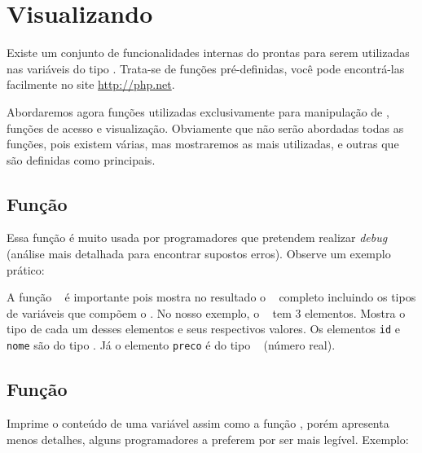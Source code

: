 

\section{Visualizando \tipoarrays}
\label{visualizando-arrays}

Existe um conjunto de funcionalidades internas do \php prontas para serem utilizadas nas variáveis
do tipo \tipoarray. Trata-se de funções pré-definidas, você pode encontrá-las facilmente no 
site \url{http://php.net}.

Abordaremos agora funções utilizadas exclusivamente para manipulação de \tipoarray, 
funções de acesso e visualização. Obviamente que não serão abordadas todas as funções, 
pois existem várias, mas mostraremos as mais utilizadas, e outras que são definidas como principais.

\subsection{Função \funcaovardump}
\label{funcao-vardump}

Essa função é muito usada por programadores que pretendem realizar \textit{debug}
(análise mais detalhada para encontrar supostos erros). Observe um exemplo prático:




A função \funcaovardump~ é importante pois mostra no resultado o \tipoarray~ completo
incluindo os tipos de variáveis que compõem o \tipoarray. No nosso exemplo, o \tipoarray~
tem 3 elementos. Mostra o tipo de cada um desses elementos e seus respectivos valores. 
Os elementos \texttt{id} e \texttt{nome} são do tipo \tipostring. Já o elemento 
\texttt{preco} é do tipo \tipofloat~ (número real).

\subsection{Função \funcaoprintr}
\label{funcao-printr}

Imprime o conteúdo de uma variável assim como a função \funcaovardump, porém apresenta 
menos detalhes, alguns programadores a preferem por ser mais legível. Exemplo:



